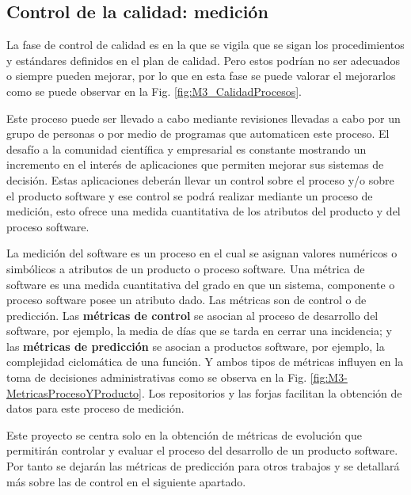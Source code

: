 
\subsection{Control de la calidad: medición}

La fase de control de calidad es en la que se vigila que se sigan los procedimientos y estándares definidos en el plan de calidad. Pero estos podrían no ser adecuados o siempre pueden mejorar, por lo que en esta fase se puede valorar el mejorarlos como se puede observar en la Fig. \ref{fig:M3_CalidadProcesos}.


Este proceso puede ser llevado a cabo mediante revisiones llevadas a cabo por un grupo de personas o por medio de programas que automaticen este proceso. El  desafío a la comunidad científica y empresarial es constante mostrando un incremento en el interés de aplicaciones que permiten  mejorar sus sistemas de decisión. Estas aplicaciones deberán llevar un control sobre el proceso y/o sobre el producto software y ese control se podrá realizar mediante un proceso de medición, esto ofrece una medida cuantitativa de los atributos del producto y del proceso software. 

La medición del software es un proceso en el cual se asignan valores numéricos o simbólicos a atributos de un producto o proceso software. Una métrica de software es una medida cuantitativa del grado en que un sistema, componente o proceso software posee un atributo dado. Las métricas son de control o de predicción. Las \textbf{métricas de control} se asocian al proceso de desarrollo del software, por ejemplo, la media de días que se tarda en cerrar una incidencia; y las \textbf{métricas de predicción} se asocian a productos software, por ejemplo, la complejidad ciclomática de una función. Y ambos tipos de métricas influyen en la toma de decisiones administrativas como se observa en la Fig. \ref{fig:M3-MetricasProcesoYProducto}. Los repositorios y las forjas facilitan la obtención de datos para este proceso de medición.


Este proyecto se centra solo en la obtención de métricas de evolución que permitirán controlar y evaluar el proceso del desarrollo de un producto software. Por tanto se dejarán las métricas de predicción para otros trabajos y se detallará más sobre las de control en el siguiente apartado.

